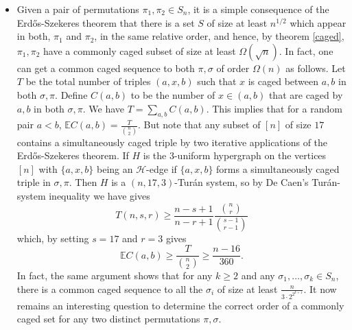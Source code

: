 \documentclass[11pt, a4paper]{article}
\theoremstyle{compact}
\begin{document}
\begin{itemize}
\item Given a pair of permutations $\pi_1,\pi_2\in S_n$, it is a simple consequence of the Erd\H{o}s-Szekeres theorem that there is a set $S$ of size at least $n^{1/2}$ which appear in both, $\pi_1$ and $\pi_2$, in the same relative order, and hence, by theorem \ref{caged}, $\pi_1,\pi_2$ have a commonly caged subset of size at least $\Omega(\sqrt{n})$. In fact, one can get a common caged sequence to both $\pi,\sigma$ of order $\Omega(n)$ as follows. Let $T$ be the total number of triples $(a,x,b)$ such that $x$ is caged between $a,b$ in both $\sigma,\pi$. Define $C(a,b)$ to be the number of $x\in (a,b)$ that are caged by $a,b$ in both $\sigma,\pi$. We have $T=\sum_{a,b} C(a,b)$. This implies that for a random pair $a<b$, $\mathbb{E}C(a,b)=\frac{T}{\binom{n}{2}}$. But note that any subset of $[n]$ of size  $17$ contains a simultaneously caged triple by two iterative applications of the Erd\H{o}s-Szekeres theorem. If $H$ is the $3$-uniform hypergraph on the vertices $[n]$ with $\{a,x,b\}$ being an $\mathcal{H}$-edge if $\{a,x,b\}$ forms a simultaneously caged triple in $\sigma, \pi$. Then $H$ is a $(n,17, 3)$-Tur\'
{a}n system, so by De Caen's Tur\'{a}n-system inequality we have gives
    \begin{equation}
        T(n,s,r)\ge \frac{n-s+1}{n-r+1}\frac{\binom{n}{r}}{\binom{s-1}{r-1}}
    \end{equation}
 which, by setting $s=17$ and $r=3$ gives
    \begin{equation}
        \mathbb{E}C(a,b)\ge \frac{T}{\binom{n}{2}}\ge \frac{n-16}{360}.
    \end{equation}
    In fact, the same argument shows that for any $k\ge 2$ and any $\sigma_1,\ldots,\sigma_k\in S_n$, there is a common caged sequence to all the $\sigma_i$ of size at least $\frac{n}{3\cdot2^{2^{k+1}}}$. It now remains an interesting question to determine the correct order of a commonly caged set for any two distinct permutations $\pi,\sigma$.



\end{itemize}
\end{document}
